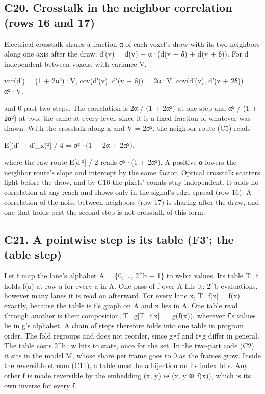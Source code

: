\subsection{\texorpdfstring{C20. Crosstalk in the neighbor correlation (rows 16 and 17)}{C20. Crosstalk in the neighbor correlation (rows 16 and 17)}}

Electrical crosstalk shares a fraction α of each voxel's draw with its two neighbors along one axis after the draw: d′(v) = d(v) + α·(d(v − δ) + d(v + δ)). For d independent between voxels, with variance V,

var(d′) = (1 + 2α²)·V,  cov(d′(v), d′(v + δ)) = 2α·V,  cov(d′(v), d′(v + 2δ)) = α²·V,

and 0 past two steps. The correlation is 2α / (1 + 2α²) at one step and α² / (1 + 2α²) at two, the same at every level, since it is a fixed fraction of whatever was drawn. With the crosstalk along x and V = 2σ², the neighbor route (C5) reads

E[(d′ − d′\_\allowbreak{}x)²] / 4 = σ²·(1 − 2α + 2α²),

where the raw route E[d′²] / 2 reads σ²·(1 + 2α²). A positive α lowers the neighbor route's slope and intercept by the same factor. Optical crosstalk scatters light before the draw, and by C16 the pixels' counts stay independent. It adds no correlation at any reach and shows only in the signal's edge spread (row 16). A correlation of the noise between neighbors (row 17) is sharing after the draw, and one that holds past the second step is not crosstalk of this form.

\subsection{\texorpdfstring{C21. A pointwise step is its table (F3′; the table step)}{C21. A pointwise step is its table (F3′; the table step)}}

Let f map the lane's alphabet A = \{0, …, 2\textasciicircum{}b − 1\} to w-bit values. Its table T\_\allowbreak{}f holds f(a) at row a for every a in A. One pass of f over A fills it: 2\textasciicircum{}b evaluations, however many lanes it is read on afterward. For every lane x, T\_\allowbreak{}f[x] = f(x) exactly, because the table is f's graph on A and x lies in A. One table read through another is their composition, T\_\allowbreak{}g[T\_\allowbreak{}f[x]] = g(f(x)), wherever f's values lie in g's alphabet. A chain of steps therefore folds into one table in program order. The fold regroups and does not reorder, since g∘f and f∘g differ in general. The table costs 2\textasciicircum{}b·w bits to state, once for the set. In the two-part code (C2) it sits in the model M, whose share per frame goes to 0 as the frames grow. Inside the reversible stream (C11), a table must be a bijection on its index bits. Any other f is made reversible by the embedding (x, y) ↦ (x, y ⊕ f(x)), which is its own inverse for every f.

